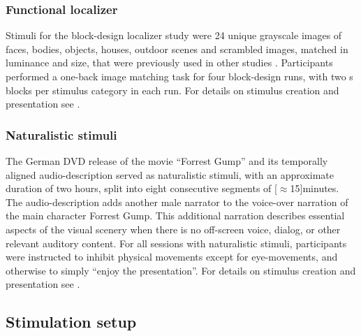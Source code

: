 
\subsubsection{Functional localizer}

Stimuli for the block-design localizer study were 24 unique grayscale images of
faces, bodies, objects, houses, outdoor scenes and scrambled images, matched in
luminance and size, that were previously used in other studies
\citep[e.g.,][]{haxby2011common}.
Participants performed a one-back image matching task for four block-design
runs, with two \unit[16]{s} blocks per stimulus category in each run.
%
For details on stimulus creation and presentation see
\citet{sengupta2016extension}.


\subsubsection{Naturalistic stimuli}
The German DVD release \citep{ForrestGumpDVD} of the movie ``Forrest Gump''
\citep{ForrestGumpMovie} and its temporally aligned audio-description
\citep{ForrestGumpGermanAD} served as naturalistic stimuli, with an approximate
duration of two hours, split into eight consecutive segments of
\unit[$\approx$15]{minutes}.
The audio-description adds another male narrator to the voice-over narration of
the main character Forrest Gump. This additional narration describes essential
aspects of the visual scenery when there is no off-screen voice, dialog, or
other relevant auditory content.
For all sessions with naturalistic stimuli, participants were instructed to
inhibit physical movements except for eye-movements, and otherwise to simply
``enjoy the presentation''.
%
For details on stimulus creation and presentation see
\citet{hanke2014audiomovie, hanke2016simultaneous}.


\subsection{Stimulation setup}


